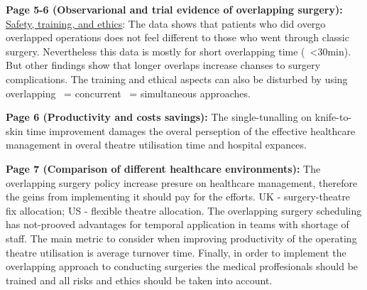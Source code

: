     \textbf{Page 5-6 (Observarional and trial evidence of overlapping surgery):}
    \underline{Safety, training, and ethics}: The data shows that patients who did overgo overlapped operations does not feel different to those who went through classic surgery. Nevertheless this data is mostly for short overlapping time (~<30min). But other findings show that longer overlaps increase chanses to surgery complications. The training and ethical aspects can also be disturbed by using overlapping ~= concurrent ~= simultaneous approaches.

    \textbf{Page 6 (Productivity and costs savings):}
    The single-tunalling on knife-to-skin time improvement damages the overal perseption of the effective healthcare management in overal theatre utilisation time and hospital expances. 

    \textbf{Page 7 (Comparison of different healthcare environments):}
    The overlapping surgery policy increase presure on healthcare management, therefore the geins from implementing it should pay for the efforts. UK - surgery-theatre fix allocation; US - flexible theatre allocation. The overlapping surgery scheduling has not-prooved advantages for temporal application in teams with shortage of staff. The main metric to consider when improving productivity of the operating theatre utilisation is average turnover time. Finally, in order to implement the overlapping approach to conducting surgeries the medical proffesionals should be trained and all risks and ethics should be taken into account. 